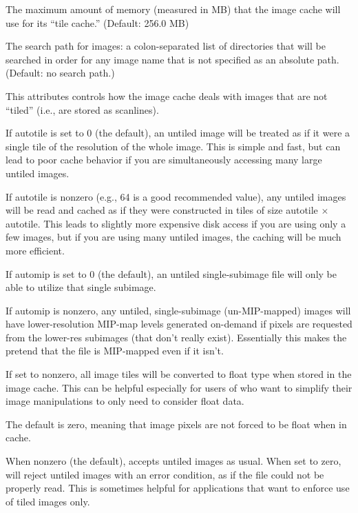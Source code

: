 The maximum amount of memory (measured in MB) that the image cache
will use for its ``tile cache.'' (Default: 256.0 MB)
\apiend

The search path for images: a colon-separated list of
directories that will be searched in order for any image name
that is not specified as an absolute path. (Default: no search path.)
\apiend

This attributes controls how the image cache deals with images that
are not ``tiled'' (i.e., are stored as scanlines). 

If {\cf autotile} is set to 0 (the default), an untiled image will be
treated as if it were a single tile of the resolution of the whole
image.  This is simple and fast, but can lead to poor cache behavior if
you are simultaneously accessing many large untiled images.

If {\cf autotile} is nonzero (e.g., 64 is a good recommended value), any
untiled images will be read and cached as if they were constructed in
tiles of size {\cf autotile} $\times$ {\cf autotile}.  This leads to
slightly more expensive disk access if you are using only a few
images, but if you are using many untiled images, the caching will be much
more efficient.
\apiend

If {\cf automip} is set to 0 (the default), an untiled single-subimage
file will only be able to utilize that single subimage.

If {\cf automip} is nonzero, any untiled, single-subimage
(un-MIP-mapped) images will have lower-resolution MIP-map levels
generated on-demand if pixels are requested from the lower-res subimages
(that don't really exist).  Essentially this makes the \ImageCache
pretend that the file is MIP-mapped even if it isn't.
\apiend

If set to nonzero, all image tiles will be converted to {\cf float} 
type when stored in the image cache.  This can be helpful especially
for users of \ImageBuf who want to simplify their image manipulations
to only need to consider {\cf float} data.

The default is zero, meaning that image pixels are not forced to
be {\cf float} when in cache.
\apiend

When nonzero (the default), \ImageCache accepts untiled images as
usual.  When set to zero, \ImageCache will reject untiled images with
an error condition, as if the file could not be properly read.
This is sometimes helpful for applications that want to enforce use of
tiled images only.
\apiend

